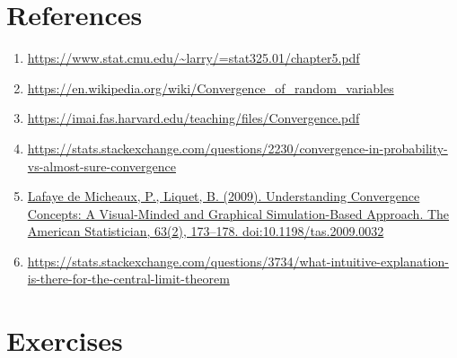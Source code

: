 \section{References}
\begin{enumerate}
    \item \url{https://www.stat.cmu.edu/~larry/=stat325.01/chapter5.pdf} 
    \item \url{https://en.wikipedia.org/wiki/Convergence_of_random_variables}
    \item \url{https://imai.fas.harvard.edu/teaching/files/Convergence.pdf}
    \item \url{https://stats.stackexchange.com/questions/2230/convergence-in-probability-vs-almost-sure-convergence}
    \item \url{Lafaye de Micheaux, P.,  Liquet, B. (2009). Understanding Convergence Concepts: A Visual-Minded and Graphical Simulation-Based Approach. The American Statistician, 63(2), 173–178. doi:10.1198/tas.2009.0032}
    \item \url{https://stats.stackexchange.com/questions/3734/what-intuitive-explanation-is-there-for-the-central-limit-theorem}
\end{enumerate}

\section{Exercises}
